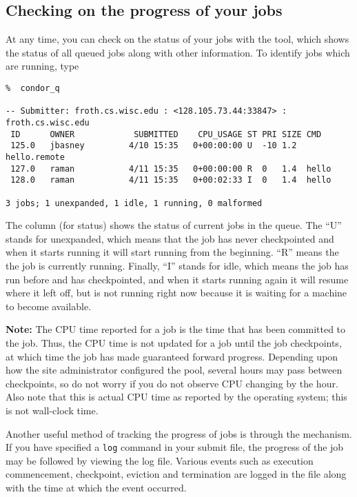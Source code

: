 \subsection{Checking on the progress of your jobs}
At any time, you can check on the status of your jobs with the 
tool, which shows the status of all queued jobs along with other information.
To identify jobs which are running, type
\begin{verbatim}
%  condor_q

-- Submitter: froth.cs.wisc.edu : <128.105.73.44:33847> : froth.cs.wisc.edu
 ID      OWNER            SUBMITTED    CPU_USAGE ST PRI SIZE CMD               
 125.0   jbasney         4/10 15:35   0+00:00:00 U  -10 1.2  hello.remote      
 127.0   raman           4/11 15:35   0+00:00:00 R  0   1.4  hello             
 128.0   raman           4/11 15:35   0+00:02:33 I  0   1.4  hello             

3 jobs; 1 unexpanded, 1 idle, 1 running, 0 malformed

\end{verbatim} 
The \verb@ST@ column (for status) shows the status of
current jobs in the queue. The ``U'' stands for unexpanded, which means
that the job has never checkpointed and when it starts running it will
start running from the beginning. ``R'' means the the job is currently
running. Finally, ``I'' stands for idle, which means the job has run
before and has checkpointed, and when it starts running again it will
resume where it left off, but is not running right now because it is
waiting for a machine to become available.

\textbf{Note:} The CPU time reported for a job is the time that has been
committed to the job.  Thus, the CPU time is not updated for a job until
the job checkpoints, at which time the job has made guaranteed forward 
progress.  Depending upon how the site administrator configured the pool,
several hours may pass between checkpoints, so do not worry if you do
not observe CPU changing by the hour.  Also note that this is actual CPU
time as reported by the operating system; this is not wall-clock time.

Another useful method of tracking the progress of jobs is through the
 mechanism.  If you have specified a \texttt{log} command in 
your submit file, the progress of the job may be followed by viewing the
log file.  Various events such as execution commencement, checkpoint, eviction 
and termination are logged in the file along with the time at which the event 
occurred.

